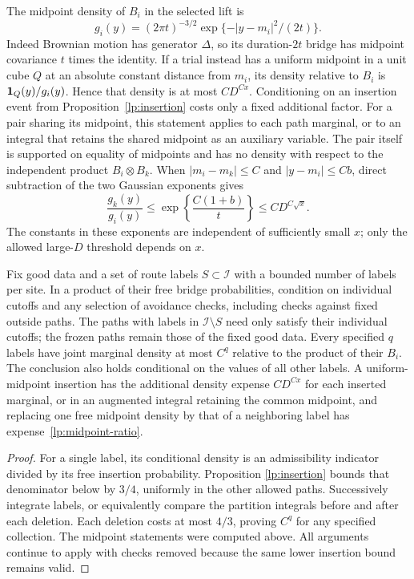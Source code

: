 The midpoint density of $B_i$ in the selected lift is
\[
 g_i(y)=(2\pi t)^{-3/2}
              \exp\{-|y-m_i|^2/(2t)\}.
\]
Indeed Brownian motion has generator $\Delta$, so its duration-$2t$
bridge has midpoint covariance $t$ times the identity.  If a trial
instead has a uniform midpoint in a unit cube $Q$ at an absolute
constant distance from $m_i$, its density relative to $B_i$ is
$\mathbf 1_Q(y)/g_i(y)$.  Hence that density is at most $CD^{Cx}$.
Conditioning on an insertion event from Proposition~\ref{lp:insertion}
costs only a fixed additional factor.  For a pair sharing its midpoint,
this statement applies to each path marginal, or to an integral that
retains the shared midpoint as an auxiliary variable.  The pair itself
is supported on equality of midpoints and has no density with respect
to the independent product $B_i\otimes B_k$.  When
$|m_i-m_k|\leq C$ and $|y-m_i|\leq Cb$, direct subtraction of the
two Gaussian exponents gives
\begin{equation}\label{lp:midpoint-ratio}
 \frac{g_k(y)}{g_i(y)}
 \leq \exp\!\left\{\frac{C(1+b)}t\right\}
 \leq C D^{C\sqrt{x}}.
\end{equation}
The constants in these exponents are independent of sufficiently
small $x$; only the allowed large-$D$ threshold depends on $x$.

\begin{corollary}\label{lp:trial-density}
Fix good data and a set of route labels $S\subset\mathcal I$ with a bounded
number of labels per site.  In a product of their free bridge
probabilities, condition on individual cutoffs and any selection of
avoidance checks, including checks against fixed outside paths.  The
paths with labels in $\mathcal I\setminus S$ need only satisfy their individual
cutoffs; the frozen paths remain those of the fixed good data.  Every specified $q$
labels have joint marginal density at most $C^q$ relative to the
product of their $B_i$.  The conclusion also holds conditional on
the values of all other labels.  A uniform-midpoint insertion has
the additional density expense $CD^{Cx}$ for each inserted marginal,
or in an augmented integral retaining the common midpoint, and
replacing one free midpoint density by that of a neighboring label
has expense~\eqref{lp:midpoint-ratio}.
\end{corollary}

\begin{proof}
For a single label, its conditional density is an admissibility
indicator divided by its free insertion probability.  Proposition
\ref{lp:insertion} bounds that denominator below by $3/4$, uniformly
in the other allowed paths.  Successively integrate labels, or
equivalently compare the partition integrals before and after each
deletion.  Each deletion costs at most $4/3$, proving $C^q$ for any
specified collection.  The midpoint statements were computed above.
All arguments continue to apply with checks removed because the same
lower insertion bound remains valid.
\end{proof}


